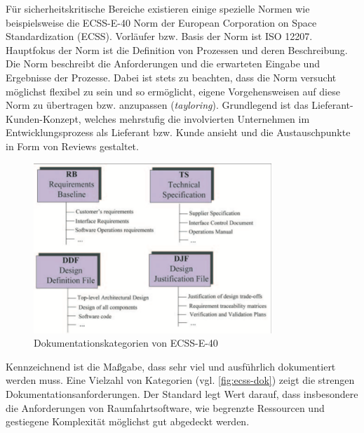 Für sicherheitskritische Bereiche existieren einige spezielle Normen wie beispielsweise die ECSS-E-40 Norm der European Corporation on Space Standardization (ECSS).
Vorläufer bzw. Basis der Norm ist ISO 12207.
Hauptfokus der Norm ist die Definition von Prozessen und deren Beschreibung. 
Die Norm beschreibt die Anforderungen und die erwarteten Eingabe und Ergebnisse der Prozesse.
Dabei ist stets zu beachten, dass die Norm versucht möglichst flexibel zu sein und so ermöglicht, eigene Vorgehensweisen auf diese Norm zu übertragen bzw. anzupassen (\emph{tayloring}).
Grundlegend ist das Lieferant-Kunden-Konzept, welches mehrstufig die involvierten Unternehmen im Entwicklungsprozess als Lieferant bzw. Kunde ansieht und die Austauschpunkte in Form von Reviews gestaltet.
\begin{figure}
  \centering
  \includegraphics[width=0.8\textwidth]{img/ecss-dokumentation.png}
  \caption{Dokumentationskategorien von ECSS-E-40 \parencite[][S. 136]{jones2002introducing}}
  \label{fig:ecss-dok}
\end{figure}
Kennzeichnend ist die Maßgabe, dass sehr viel und ausführlich dokumentiert werden muss.
Eine Vielzahl von Kategorien (vgl. \autoref{fig:ecss-dok}) zeigt die strengen Dokumentationsanforderungen.
Der Standard legt Wert darauf, dass insbesondere die Anforderungen von Raumfahrtsoftware, wie begrenzte Ressourcen und gestiegene Komplexität möglichst gut abgedeckt werden.
\parencite[Vgl.][]{jones2002introducing}

